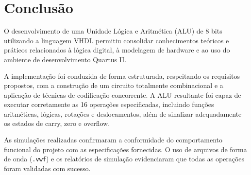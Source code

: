\section{Conclusão}

O desenvolvimento de uma Unidade Lógica e Aritmética (ALU) de 8 bits utilizando a linguagem VHDL permitiu consolidar conhecimentos teóricos e práticos relacionados à lógica digital, à modelagem de hardware e ao uso do ambiente de desenvolvimento Quartus II.

A implementação foi conduzida de forma estruturada, respeitando os requisitos propostos, com a construção de um circuito totalmente combinacional e a aplicação de técnicas de codificação concorrente. A ALU resultante foi capaz de executar corretamente as 16 operações especificadas, incluindo funções aritméticas, lógicas, rotações e deslocamentos, além de sinalizar adequadamente os estados de carry, zero e overflow.

As simulações realizadas confirmaram a conformidade do comportamento funcional do projeto com as especificações fornecidas. O uso de arquivos de forma de onda (\texttt{.vwf}) e os relatórios de simulação evidenciaram que todas as operações foram validadas com sucesso.